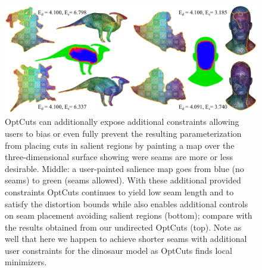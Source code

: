 \begin{figure}[t]
\centering
\includegraphics[width=\linewidth]{fig/regional_user.png}
\caption{OptCuts can additionally expose additional constraints allowing 
users to bias or even fully prevent the resulting parameterization from placing cuts in salient regions by painting a map over the three-dimensional surface showing were seams are more or less desirable. 
Middle: a user-painted salience map goes from blue (no seams) to green (seams allowed). With these additional provided constraints OptCuts continues to yield low seam length and to satisfy the distortion bounds while also enables additional controls on seam placement avoiding salient regions (bottom); compare with the results obtained from our undirected OptCuts (top). Note as well that here we happen to achieve shorter seams with additional user constraints for the dinosaur model as OptCuts finds local minimizers.}
\label{fig:regional_seam_placement}
\end{figure}


